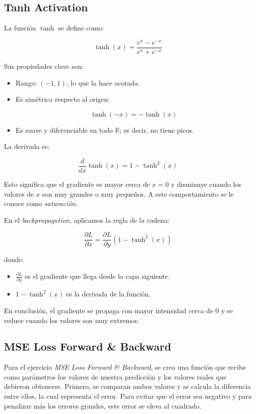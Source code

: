 \documentclass[12pt]{article}
\begin{document}
\subsection{Tanh Activation}
La función $\tanh$ se define como:

\[
\tanh(x)=\frac{e^x-e^{-x}}{e^x+e^{-x}}
\]

Sus propiedades clave son:

\begin{itemize}
\item Rango: $(-1,1)$, lo que la hace acotada.
\item Es simétrica respecto al origen:

\[
\tanh(-x)=-\tanh(x)
\]

\item Es suave y diferenciable en todo $\mathbb{R}$; es decir, no tiene picos.
\end{itemize}

La derivada es:

\[
\frac{d}{dx}\tanh(x)=1-\tanh^2(x)
\]

Esto significa que el gradiente es mayor cerca de $x=0$ y disminuye cuando los valores de $x$ son muy grandes o muy pequeños. A este comportamiento se le conoce como \textit{saturación}.

En el \textit{backpropagation}, aplicamos la regla de la cadena:

\[
\frac{\partial L}{\partial x}
=
\frac{\partial L}{\partial y}
\left(1-\tanh^2(x)\right)
\]

donde:

\begin{itemize}
\item $\frac{\partial L}{\partial y}$ es el gradiente que llega desde la capa siguiente.
\item $1-\tanh^2(x)$ es la derivada de la función.
\end{itemize}

En conclusión, el gradiente se propaga con mayor intensidad cerca de $0$ y se reduce cuando los valores son muy extremos.

\subsection{MSE Loss Forward \& Backward}

Para el ejercicio \textit{MSE Loss Forward \& Backward}, se crea una función que recibe como parámetros los valores de 
nuestra predicción y los valores reales que debieron obtenerse. Primero, se comparan ambos valores y se calcula la 
diferencia entre ellos, la cual representa el error. Para evitar que el error sea negativo y para penalizar más los 
errores grandes, este error se eleva al cuadrado.
\end{document}

